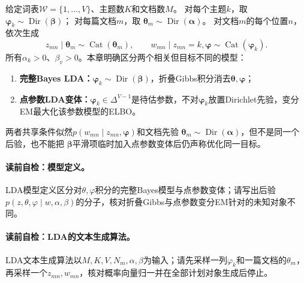 \begin{definition}[潜在狄利克雷分配模型]\label{def:V5-C06-lda}
给定词表$\mathcal W=\{1,\ldots,V\}$、主题数$K$和文档数$M$。
对每个主题$k$，取
$\boldsymbol\varphi_k\sim\operatorname{Dir}(\boldsymbol\beta)$；
对每篇文档$m$，取
$\boldsymbol\theta_m\sim\operatorname{Dir}(\boldsymbol\alpha)$。
对文档$m$的每个位置$n$，依次生成
\[
z_{mn}\mid\boldsymbol\theta_m\sim\operatorname{Cat}(\boldsymbol\theta_m),
\qquad
w_{mn}\mid z_{mn}=k,\boldsymbol\varphi
\sim\operatorname{Cat}(\boldsymbol\varphi_k).
\]
所有$\alpha_k>0$、$\beta_v>0$。本章明确区分两个相关但目标不同的模型：
\begin{enumerate}[leftmargin=2em]
  \item \textbf{完整Bayes LDA：}$\boldsymbol\varphi_k\sim\operatorname{Dir}(\boldsymbol\beta)$，折叠Gibbs积分消去$\boldsymbol\theta,\boldsymbol\varphi$；
  \item \textbf{点参数LDA变体：}$\boldsymbol\varphi_k\in\Delta^{V-1}$是待估参数，不对$\boldsymbol\varphi_k$放置Dirichlet先验，变分EM最大化该参数模型的ELBO。
\end{enumerate}
两者共享条件似然$p(w_{mn}\mid z_{mn},\boldsymbol\varphi)$和文档先验
$\boldsymbol\theta_m\sim\operatorname{Dir}(\boldsymbol\alpha)$，但不是同一个后验，也不能把
$\boldsymbol\beta$平滑项临时加入点参数变体后仍声称优化同一目标。
\end{definition}


\paragraph{读前自检：模型定义。}LDA模型定义区分对$\theta,\varphi$积分的完整Bayes模型与点参数变体；请写出后验$p(z,\theta,\varphi\mid w,\alpha,\beta)$的分子，核对折叠Gibbs与点参数变分EM针对的未知对象不同。\par
\paragraph{读前自检：LDA的文本生成算法。}LDA文本生成算法以$M,K,V,N_m,\alpha,\beta$为输入；请先采样一列$\varphi_k$和一篇文档的$\theta_m$，再采样一个$z_{mn},w_{mn}$，核对概率向量归一并在全部计划对象生成后停止。\par
